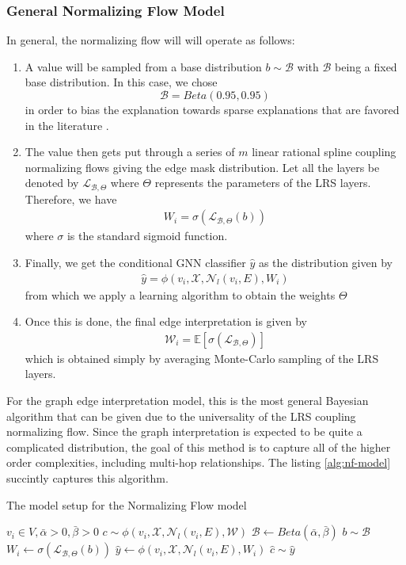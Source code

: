 \subsubsection{General Normalizing Flow Model}
In general, the normalizing flow will will operate as follows:
\begin{enumerate}
	\item A value will be sampled from a base distribution $b \sim \mathcal{B}$ with $\mathcal{B}$ being a fixed base distribution. In this case, we chose 
	\[
		\mathcal{B} = Beta(0.95, 0.95)
	\]
	in order to bias the explanation towards sparse explanations that are favored in the literature \cite{yuan_explainability_2021}.
	\item The value then gets put through a series of $m$ linear rational spline coupling normalizing flows giving the edge mask distribution. Let all the layers be denoted by $\mathcal{L}_{\mathcal{B}, \Theta}$ where $\Theta$ represents the parameters of the LRS layers. Therefore, we have
	\begin{align*}
		W_i = \sigma(\mathcal{L}_{\mathcal{B}, \Theta}(b))
	\end{align*}
	where $\sigma$ is the standard sigmoid function.
	\item Finally, we get the conditional GNN classifier $\hat{y}$ as the distribution given by
	\begin{align*}
		\hat{y} = \phi(v_i, \mathcal{X}, \mathcal{N}_l(v_i, E), W_i)
	\end{align*}
	from which we apply a learning algorithm to obtain the weights $\Theta$
	\item Once this is done, the final edge interpretation is given by
	\begin{align*}
		\mathcal{W}_i = \mathbb{E}[\sigma(\mathcal{L}_{\mathcal{B}, \Theta})]
	\end{align*}
	which is obtained simply by averaging Monte-Carlo sampling of the LRS layers.
\end{enumerate}
For the graph edge interpretation model, this is the most general Bayesian algorithm that can be given due to the universality of the LRS coupling normalizing flow. Since the graph interpretation is expected to be quite a complicated distribution, the goal of this method is to capture all of the higher order complexities, including multi-hop relationships. The listing \ref{alg:nf-model} succintly captures this algorithm.
\begin{algorithm}[h]
	\centering
	\caption{The model setup for the Normalizing Flow model}
	\label{alg:nf-model}
	\begin{algorithmic}
		\Require $v_i \in V, \bar{\alpha} > 0, \bar{\beta} > 0$
		\Require $c \sim \phi(v_i, \mathcal{X}, \mathcal{N}_l(v_i, E), \mathcal{W})$
		\State $\mathcal{B} \gets Beta(\bar{\alpha}, \bar{\beta})$
		\State $b \sim \mathcal{B}$
		\State $W_i \gets \sigma(\mathcal{L}_{\mathcal{B}, \Theta}(b))$
		\State $\hat{y} \gets \phi(v_i, \mathcal{X}, \mathcal{N}_l(v_i, E), W_i)$
		\State $\hat{c} \sim \hat{y}$
	\end{algorithmic}
\end{algorithm}

